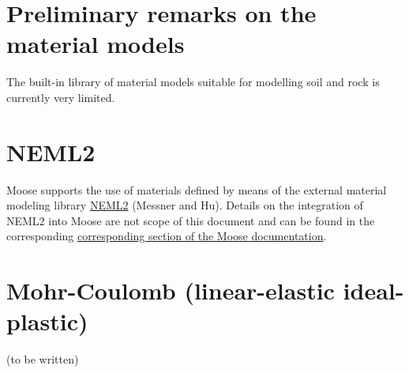 \section{Preliminary remarks on the material models}
\label{chap:material-remarks}

The built-in library of material models suitable for modelling soil and rock is
currently very limited.

\section{NEML2}
\label{chap:material-NEML2}

Moose supports the use of materials defined by means of the external material
modeling library \href{https://github.com/reverendbedford/neml2}{NEML2}
(Messner and Hu). Details on the integration of NEML2 into Moose are not scope
of this document and can be found in the corresponding
\href{https://mooseframework.inl.gov/moose/modules/solid_mechanics/NEML2.html}{corresponding
      section of the Moose documentation}.

\section{\todomarker Mohr-Coulomb (linear-elastic ideal-plastic)}
\label{chap:material-mohr-coulomb}

(to be written)
